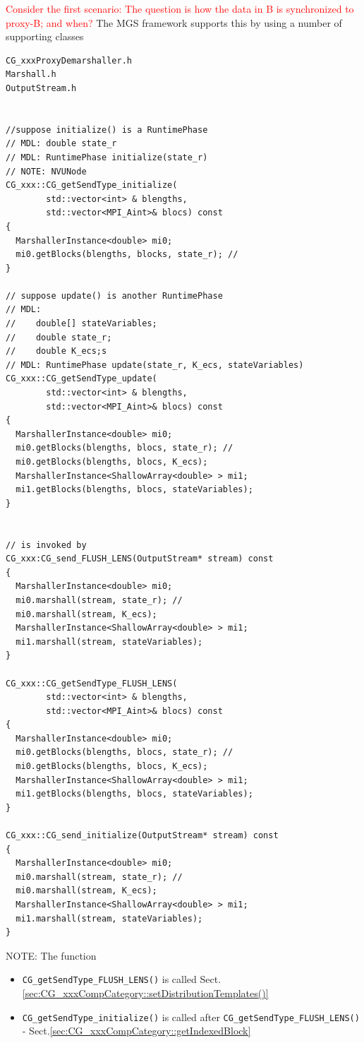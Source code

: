 \textcolor{red}{Consider the first scenario: The question is how the data in B
is synchronized to proxy-B; and when?} The MGS framework supports this by using
a number of supporting classes
\begin{verbatim}
CG_xxxProxyDemarshaller.h
Marshall.h
OutputStream.h


//suppose initialize() is a RuntimePhase
// MDL: double state_r
// MDL: RuntimePhase initialize(state_r)
// NOTE: NVUNode
CG_xxx::CG_getSendType_initialize(
        std::vector<int> & blengths, 
        std::vector<MPI_Aint>& blocs) const
{  
  MarshallerInstance<double> mi0;
  mi0.getBlocks(blengths, blocks, state_r); // 
}

// suppose update() is another RuntimePhase
// MDL: 
//    double[] stateVariables;
//    double state_r;
//    double K_ecs;s
// MDL: RuntimePhase update(state_r, K_ecs, stateVariables)
CG_xxx::CG_getSendType_update(
        std::vector<int> & blengths, 
        std::vector<MPI_Aint>& blocs) const
{
  MarshallerInstance<double> mi0;
  mi0.getBlocks(blengths, blocs, state_r); // 
  mi0.getBlocks(blengths, blocs, K_ecs);
  MarshallerInstance<ShallowArray<double> > mi1;
  mi1.getBlocks(blengths, blocs, stateVariables);
}


// is invoked by 
CG_xxx:CG_send_FLUSH_LENS(OutputStream* stream) const
{
  MarshallerInstance<double> mi0;
  mi0.marshall(stream, state_r); // 
  mi0.marshall(stream, K_ecs);
  MarshallerInstance<ShallowArray<double> > mi1;
  mi1.marshall(stream, stateVariables);
}

CG_xxx::CG_getSendType_FLUSH_LENS(
        std::vector<int> & blengths, 
        std::vector<MPI_Aint>& blocs) const
{
  MarshallerInstance<double> mi0;
  mi0.getBlocks(blengths, blocs, state_r); // 
  mi0.getBlocks(blengths, blocs, K_ecs);
  MarshallerInstance<ShallowArray<double> > mi1;
  mi1.getBlocks(blengths, blocs, stateVariables);
}

CG_xxx::CG_send_initialize(OutputStream* stream) const
{  
  MarshallerInstance<double> mi0;
  mi0.marshall(stream, state_r); // 
  mi0.marshall(stream, K_ecs);
  MarshallerInstance<ShallowArray<double> > mi1;
  mi1.marshall(stream, stateVariables);
}
\end{verbatim}
\label{sec:CG_getSendType_FLUSH_LENS()}

NOTE: The function 
\begin{itemize}
  \item \verb!CG_getSendType_FLUSH_LENS()! is called 
  Sect.\ref{sec:CG_xxxCompCategory::setDistributionTemplates()}
  
  \item \verb!CG_getSendType_initialize()! is called after 
  \verb!CG_getSendType_FLUSH_LENS()! - Sect.\ref{sec:CG_xxxCompCategory::getIndexedBlock}
  
\end{itemize}

